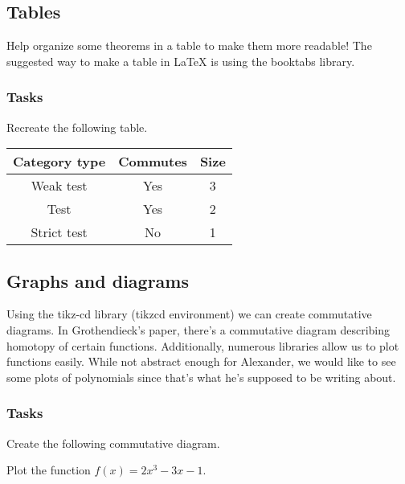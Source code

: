 \documentclass[a4paper,beeees]{hwhProblem}
\newcommand{\funciso}[2][F]{#1 \simeq{} #1 \times{} e_{#2}}
\begin{document}
\subsection*{Tables}
Help organize some theorems in a table to make them more readable! The suggested way to make a table in \LaTeX{} is using the booktabs library.
\subsubsection*{Tasks}
Recreate the following table.
\begin{table}[h]
    \begin{tabular}{c c c}\toprule
      Category type & Commutes & Size\\\midrule
      Weak test & Yes & 3\\
      Test & Yes & 2\\
      Strict test & No & 1\\\bottomrule
    \end{tabular}
  \centering
\end{table}

\subsection*{Graphs and diagrams}
Using the tikz-cd library (tikzcd environment) we can create commutative diagrams. In Gro\-then\-dieck's paper, there's a commutative diagram describing homotopy of certain functions. Additionally, numerous libraries allow us to plot functions easily. While not abstract enough for Alexander, we would like to see some plots of polynomials since that's what he's supposed to be writing about.
\subsubsection*{Tasks}
Create the following commutative diagram.
\begin{center}
\end{center}
Plot the function \(f(x) = 2x^3-3x-1\).
\begin{figure}[H]
  \centering
\end{figure}
\end{document}
